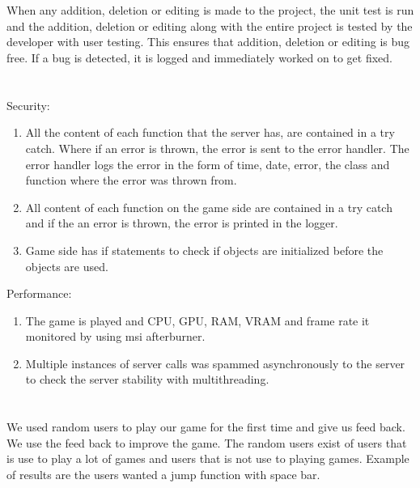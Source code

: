 \documentclass[letterpaper]{article}
\begin{document}
	\section*{\colorbox{black}{}} 
	\vspace{0.1in}
	
	When any addition, deletion or editing is made to the project, the unit test is run and the addition, deletion or editing along with the entire project is tested by the developer with user testing. This ensures that addition, deletion or editing is bug free. If a bug is detected, it is logged and immediately worked on to get fixed. 
	
	\section*{\colorbox{black}{}} 
	\vspace{0.1in}
	
	Security:
	\begin{enumerate}
		\item All the content of each function that the server has, are contained in a try catch. Where if an error is thrown, the error is sent to the error handler. The error handler logs the error in the form of time, date, error, the class and function where the error was thrown from.
	\item All content of each function on the game side are contained in a try catch and if the an error is thrown, the error is printed in the logger.
	\item Game side has if statements to check if objects are initialized before the objects are used.
	\end{enumerate}
	
	Performance:
	\begin{enumerate}
		\item The game is played and CPU, GPU, RAM, VRAM and frame rate it monitored by using msi afterburner.
		\item Multiple instances of server calls was spammed asynchronously to the server to check the server stability with multithreading.
	\end{enumerate}
	
	\section*{\colorbox{black}{}} 
	\vspace{0.1in}
	
	We used random users to play our game for the first time and give us feed back. We use the feed back to improve the game. The random users exist of users that is use to play a lot of games and users that is not use to playing games. Example of results are the users wanted a jump function with space bar.

\end{document}
